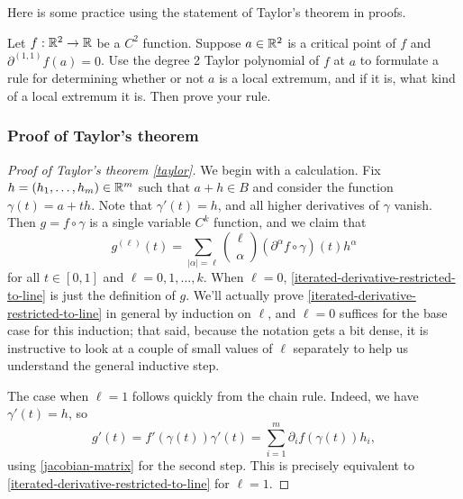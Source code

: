 Here is some practice using the statement of Taylor's theorem in proofs. 

\begin{exercise}
	Let $f : \mathbb{R}^2 \to \mathbb{R}$ be a $C^2$ function. Suppose $a \in \mathbb{R}^2$ is a critical point of $f$ and $\partial^{(1,1)}f(a) = 0$. Use the degree 2 Taylor polynomial of $f$ at $a$ to formulate a rule for determining whether or not $a$ is a local extremum, and if it is, what kind of a local extremum it is. Then prove your rule. 
\end{exercise}

\subsubsection*{Proof of Taylor's theorem}

\begin{proof}[Proof of Taylor's theorem \ref{taylor}]
	We begin with a calculation. Fix $h = (h_1, \dotsc, h_m) \in \mathbb{R}^m$ such that $a + h \in B$ and consider the function $\gamma(t) = a + th$. Note that $\gamma'(t) = h$, and all higher derivatives of $\gamma$ vanish. Then $g = f \circ \gamma$ is a single variable $C^k$ function, and we claim that 
	\begin{equation} \label{iterated-derivative-restricted-to-line} g^{(\ell)}(t) = \sum_{|\alpha| = \ell} \binom{\ell}{\alpha} (\partial^\alpha f \circ \gamma)(t) h^\alpha \end{equation}
	for all $t \in [0,1]$ and $\ell = 0, 1, \dotsc, k$. When $\ell = 0$, \cref{iterated-derivative-restricted-to-line} is just the definition of $g$. We'll actually prove \cref{iterated-derivative-restricted-to-line} in general by induction on $\ell$, and $\ell = 0$ suffices for the base case for this induction; that said, because the notation gets a bit dense, it is instructive to look at a couple of small values of $\ell$ separately to help us understand the general inductive step. 
	
	The case when $\ell = 1$ follows quickly from the chain rule. Indeed, we have $\gamma'(t) = h$, so
	\[ g'(t) = f'(\gamma(t))\gamma'(t) = \sum_{i = 1}^m \partial_i f(\gamma(t))h_i, \]
	using \cref{jacobian-matrix} for the second step. This is precisely equivalent to \cref{iterated-derivative-restricted-to-line} for $\ell = 1$. 
	

\end{proof}
